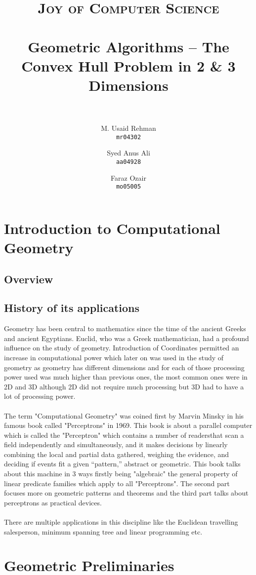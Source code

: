 \documentclass[paper=a4, fontsize=11pt]{scrartcl}
\title{
		\usefont{OT1}{bch}{b}{n}
		\normalfont \normalsize \textsc{Joy of Computer Science} \\ [25pt]
		\horrule{0.5pt} \\[0.4cm]
		\huge Geometric Algorithms -- The Convex Hull Problem in 2 \& 3 Dimensions \\
		\horrule{2pt} \\[0.5cm]
}
\author{
		\normalfont 								\normalsize
        M. Usaid Rehman\\[-3pt]		\normalsize
        \texttt{mr04302}
        \and 
        \normalfont 								\normalsize
        Syed Anus Ali\\[-3pt]		\normalsize
        \texttt{aa04928}
        \and 
        \normalfont 								\normalsize
        Faraz Ozair\\[-3pt]		\normalsize
        \texttt{mo05005}
}
\date{}
\numberwithin{equation}{section}		%
\numberwithin{figure}{section}			%
\numberwithin{table}{section}				%
\begin{document}
\maketitle

\section{Introduction to Computational Geometry}
\subsection{Overview}
 
\subsection{History of its applications}
Geometry has been central to mathematics since the time of the ancient Greeks and ancient Egyptians. Euclid, who was a Greek mathematician, had a profound influence on the study of geometry. Introduction of Coordinates permitted an increase in computational power which later on was used in the study of geometry as geometry has different dimensions and for each of those processing power used was much higher than previous ones, the most common ones were in 2D and 3D although 2D did not require much processing but 3D had to have a lot of processing power.\\
\\
The term "Computational Geometry" was coined first by 
Marvin Minsky in his famous book called "Perceptrons" in 1969. This book is about a parallel computer which is called the "Perceptron" which contains a number of readersthat scan a field independently and simultaneously,  and it makes decisions by linearly combining the local and partial data gathered, weighing the evidence, and deciding if events fit a given “pattern,” abstract or geometric. This book talks about this machine in 3 ways firstly being "algebraic" the general property of linear predicate families which apply to all "Perceptrons". The second part focuses more on geometric patterns and theorems and the third part talks about perceptrons as practical devices. \\
\\
There are multiple applications in this discipline like the Euclidean travelling salesperson, minimum spanning tree and linear programming etc. 
\section{Geometric Preliminaries}
\end{document}
